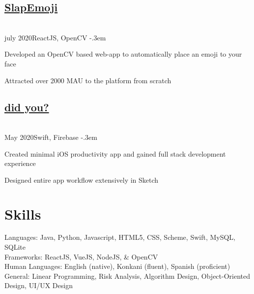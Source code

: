 \documentclass{article}
\let\olditemize=\itemize \let\endolditemize=\enditemize
\renewenvironment{itemize}{\olditemize[topsep=0em] \itemsep-.3em}{\endolditemize}
\newcommand{\entry}[3]{\quad\textbf{#1}\\#2\qquad#3}
\begin{document}
	\subsection{\texorpdfstring{\protect\href{https://github.com/jaykudva/SlapEmoji}{SlapEmoji}} ?}
	\entry{}{july 2020}{ReactJS, OpenCV}
	\begin{itemize}
		\item Developed an OpenCV based web-app to automatically place an emoji to your face
		\item Attracted over 2000 MAU to the platform from scratch
	\end{itemize}

	\subsection{\texorpdfstring{\protect\href{https://github.com/jaykudva/did-you-}{did you?}} ?}
	\entry{}{May 2020}{Swift, Firebase}
	\begin{itemize}
		\item Created minimal iOS productivity app and gained full stack development experience
		\item Designed entire app workflow extensively in Sketch
	\end{itemize}
	
	\section{Skills}
	Languages:
	Java, Python, Javascript, HTML5, CSS, Scheme, Swift, MySQL, SQLite \\
	Frameworks:
	ReactJS, VueJS, NodeJS, \& OpenCV \\
	Human Languages:
	English (native), Konkani (fluent), Spanish (proficient) \\
	General:
	Linear Programming, Risk Analysis, Algorithm Design, Object-Oriented Design, UI/UX Design
	
	
\end{document}

